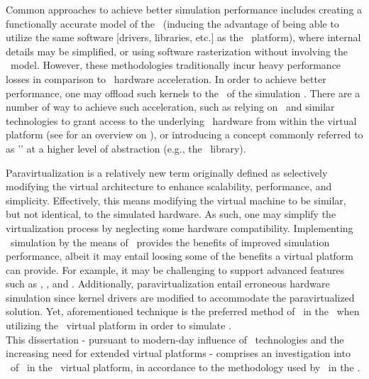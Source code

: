 Common approaches to achieve better simulation performance includes creating a functionally accurate model of the \dvttermgpu\ (inducing the advantage of being able to utilize the same software [drivers, libraries, etc.] as the \dvttermhost\ platform), where internal details may be simplified, or using software rasterization without involving the \dvttermgpu\ model.
However, these methodologies traditionally incur heavy performance losses in comparison to \dvttermgpu\ hardware acceleration.
In order to achieve better performance, one may offload such kernels to the \dvttermgpu\ of the simulation \dvttermhost .
There are a number of way to achieve such acceleration, such as relying on \dvttermpcipassthrough\ and similar technologies to grant access to the underlying \dvttermhost\ hardware from within the virtual platform (see  for an overview on \dvttermpcipassthrough ), or introducing a concept commonly referred to as '\dvttermparavirtualization ' at a higher level of abstraction (e.g., the \dvttermopengl\ library).

Paravirtualization is a relatively new term originally defined as selectively modifying the virtual architecture to enhance scalability, performance, and simplicity.
Effectively, this means modifying the virtual machine to be similar, but not identical, to the simulated hardware.
As such, one may simplify the virtualization process by neglecting some hardware compatibility.
Implementing \dvttermgpu\ simulation by the means of \dvttermparavirtualization\ provides the benefits of improved simulation performance, albeit it may entail loosing some of the benefits a virtual platform can provide.
For example, it may be challenging to support advanced features such as \dvttermdeterministicexecution , \dvttermcheckpointing , and \dvttermreverseexecution .
Additionally, paravirtualization entail erroneous hardware simulation since kernel drivers are modified to accommodate the paravirtualized solution.
Yet, aforementioned technique is the preferred method of \dvttermgoogle\ in the \dvttermandroidsdk\ when utilizing the \dvttermqemu\ virtual platform in order to simulate \dvttermopengles .\\

\noindent
This dissertation - pursuant to  modern-day influence of \dvttermgpu\ technologies and the increasing need for extended virtual platforms - comprises an investigation into \dvttermparavirtualization\ of \dvttermopengles\ in the \dvttermsimics\ virtual platform, in accordance to the methodology used by \dvttermgoogle\ in the \dvttermandroidsdk .

